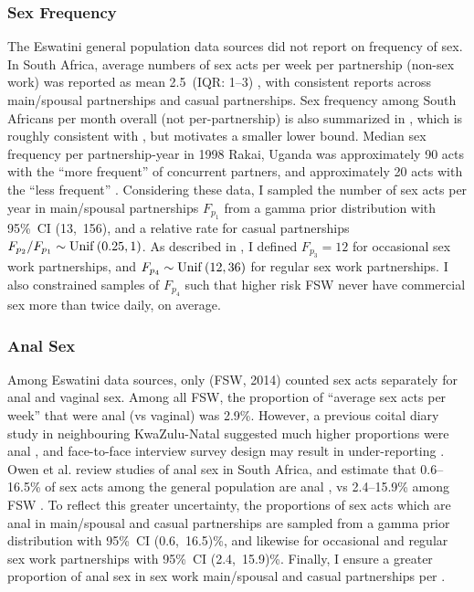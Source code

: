 \subsubsection{Sex Frequency}\label{model.par.sex.freq}
The Eswatini general population data sources \cite{SDHS2006,SHIMS1,SHIMS2}
did not report on frequency of sex. %
In South Africa, average numbers of sex acts per week per partnership (non-sex work)
was reported as mean 2.5~(IQR: 1--3) \cite{Delva2013},
with consistent reports across main/spousal partnerships and casual partnerships.
Sex frequency among South Africans per month overall (not per-partnership)
is also summarized in \cite[Figure~3.15]{Shisana2005},
which is roughly consistent with \cite{Delva2013}, but motivates a smaller lower bound.
Median sex frequency per partnership-year in 1998 Rakai, Uganda was
approximately 90 acts with the ``more frequent'' of concurrent partners, and
approximately 20 acts with the ``less frequent'' \cite{Morris2010}.
Considering these data,
I sampled the number of sex acts per year in main/spousal partnerships
$F_{p_{1}}$ from a gamma prior distribution with 95\%~CI (13,~156),
and a relative rate for casual partnerships $F_{p_{2}}/F_{p_{1}} \sim \operatorname{Unif}\,(0.25,1)$.
As described in ,
I defined $F_{p_{3}} = 12$ for occasional sex work partnerships,
and $F_{p_{4}} \sim \operatorname{Unif}\,(12,36)$ for regular sex work partnerships.
I also constrained samples of $F_{p_{4}}$ such that
higher risk FSW never have commercial sex more than twice daily, on average.
\subsubsection{Anal Sex}\label{model.par.sex.anal}
Among Eswatini data sources, only \cite{EswKP2014} (FSW, 2014)
counted sex acts separately for anal and vaginal sex.
Among all FSW, the proportion of ``average sex acts per week'' that were anal (vs vaginal) was 2.9\%.
However, a previous coital diary study in neighbouring KwaZulu-Natal suggested
much higher proportions were anal \cite{Ramjee1999},
and face-to-face interview survey design may result in under-reporting \cite{Owen2020}.
Owen et al. review studies of anal sex in South Africa, and estimate that
0.6--16.5\% of sex acts among the general population are anal \cite{Owen2017}, vs
2.4--15.9\% among FSW \cite{Owen2020}.
To reflect this greater uncertainty, the proportions of sex acts which are anal
in main/spousal and casual partnerships are sampled
from a gamma prior distribution with 95\%~CI (0.6,~16.5)\%,
and likewise for occasional and regular sex work partnerships with 95\%~CI (2.4,~15.9)\%.
Finally, I ensure a greater proportion of anal sex
in sex work \vs main/spousal and casual partnerships per .
